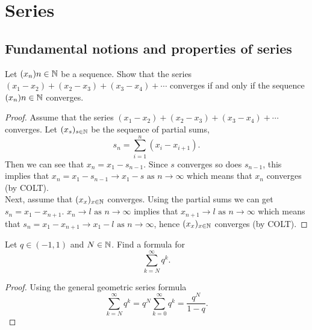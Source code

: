 \documentclass[10pt, a4paper]{article}
\newcommand{\limas}[3][n]{#2 \rightarrow #3 \text{ as } #1 \rightarrow \infty}
\newcommand{\infsum}[1][n = 1]{\sum_{#1}^{\infty}}
\newcommand{\seq}[2][x]{(#1_{#2})_{#2 \in \N}}
\begin{document}
\newpage

\section{Series}

\subsection{Fundamental notions and properties of series}

\begin{example}
    Let $(x_n){n \in \mathbb{N}}$ be a sequence. Show that the series
    $(x_1 - x_2) + (x_2 - x_3) + (x_3 - x_4) + \cdots$ converges if and only if the sequence $(x_n){n \in \mathbb{N}}$ converges.
    \begin{proof}
        Assume that the series $(x_1 - x_2) + (x_2 - x_3) + (x_3 - x_4) + \cdots$ converges. Let $\seq{s}$ be the sequence of partial sums,
        \[
        s_n = \sum_{i = 1}^{n}(x_i - x_{i + 1}).
        \]
        Then we can see that $x_n = x_1 - s_{n - 1}$. Since $s$ converges so does $s_{n - 1}$, this implies that $\limas{x_n = x_1 - s_{n - 1}}{x_1 - s}$ which means that $x_n$ converges (by COLT). \\

        Next, assume that $\seq{x}$ converges. Using the partial sums we can get $s_n = x_1 - x_{n + 1}$. $\limas{x_n}{l}$ implies that $\limas{x_{n + 1}}{l}$ which means that $\limas{s_n = x_1 - x_{n + 1}}{x_1 - l}$, hence $\seq{x}$ converges (by COLT).
    \end{proof}
\end{example}

\begin{example}
    Let $q \in (-1, 1)$ and $N \in \mathbb{N}$. Find a formula for
    \[
    \infsum[k = N]{q ^ k}.
    \]
    \begin{proof}
        Using the general geometric series formula
        \[
        \infsum[k = N] q ^ k = q ^ N \infsum[k = 0] q ^ k = \frac{q ^ N}{1 - q}.
        \]
    \end{proof}
\end{example}
\end{document}
